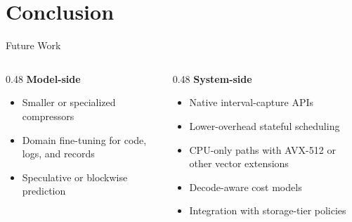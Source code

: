 
\section{Conclusion}

\begin{frame}{Future Work}
  \begin{columns}[T, onlytextwidth]
    \begin{column}{0.48\textwidth}
      \textbf{Model-side}
      \begin{itemize}
        \item Smaller or specialized compressors
        \item Domain fine-tuning for code, logs, and records
        \item Speculative or blockwise prediction
      \end{itemize}
    \end{column}
    \hfill
    \begin{column}{0.48\textwidth}
      \textbf{System-side}
      \begin{itemize}
        \item Native interval-capture APIs
        \item Lower-overhead stateful scheduling
        \item CPU-only paths with AVX-512 or other vector extensions
        \item Decode-aware cost models
        \item Integration with storage-tier policies
      \end{itemize}
    \end{column}
  \end{columns}
\end{frame}


